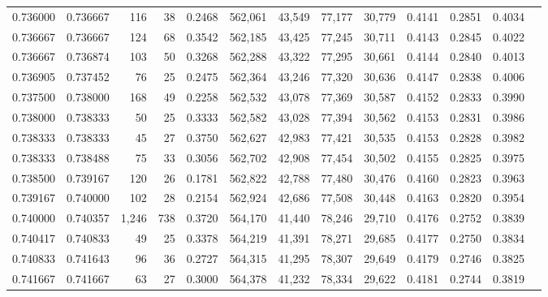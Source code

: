\begin{tabular}{rrrrrrrrrrrrr}
0.736000 & 0.736667 &   116 &  38 &                                     0.2468 & 562,061 &  43,549 &  77,177 &  30,779 & 0.4141 & 0.2851 & 0.4034 \\
0.736667 & 0.736667 &   124 &  68 &                                     0.3542 & 562,185 &  43,425 &  77,245 &  30,711 & 0.4143 & 0.2845 & 0.4022 \\
0.736667 & 0.736874 &   103 &  50 &                                     0.3268 & 562,288 &  43,322 &  77,295 &  30,661 & 0.4144 & 0.2840 & 0.4013 \\
0.736905 & 0.737452 &    76 &  25 &                                     0.2475 & 562,364 &  43,246 &  77,320 &  30,636 & 0.4147 & 0.2838 & 0.4006 \\
0.737500 & 0.738000 &   168 &  49 &                                     0.2258 & 562,532 &  43,078 &  77,369 &  30,587 & 0.4152 & 0.2833 & 0.3990 \\
0.738000 & 0.738333 &    50 &  25 &                                     0.3333 & 562,582 &  43,028 &  77,394 &  30,562 & 0.4153 & 0.2831 & 0.3986 \\
0.738333 & 0.738333 &    45 &  27 &                                     0.3750 & 562,627 &  42,983 &  77,421 &  30,535 & 0.4153 & 0.2828 & 0.3982 \\
0.738333 & 0.738488 &    75 &  33 &                                     0.3056 & 562,702 &  42,908 &  77,454 &  30,502 & 0.4155 & 0.2825 & 0.3975 \\
0.738500 & 0.739167 &   120 &  26 &                                     0.1781 & 562,822 &  42,788 &  77,480 &  30,476 & 0.4160 & 0.2823 & 0.3963 \\
0.739167 & 0.740000 &   102 &  28 &                                     0.2154 & 562,924 &  42,686 &  77,508 &  30,448 & 0.4163 & 0.2820 & 0.3954 \\
0.740000 & 0.740357 & 1,246 & 738 &                                     0.3720 & 564,170 &  41,440 &  78,246 &  29,710 & 0.4176 & 0.2752 & 0.3839 \\
0.740417 & 0.740833 &    49 &  25 &                                     0.3378 & 564,219 &  41,391 &  78,271 &  29,685 & 0.4177 & 0.2750 & 0.3834 \\
0.740833 & 0.741643 &    96 &  36 &                                     0.2727 & 564,315 &  41,295 &  78,307 &  29,649 & 0.4179 & 0.2746 & 0.3825 \\
0.741667 & 0.741667 &    63 &  27 &                                     0.3000 & 564,378 &  41,232 &  78,334 &  29,622 & 0.4181 & 0.2744 & 0.3819 \\

\end{tabular}
